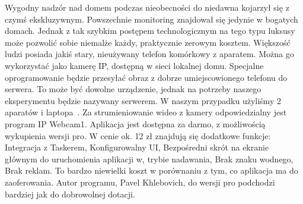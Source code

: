 \documentclass[brudnopis]{xmgr}
\begin{document}
Wygodny nadzór nad domem podczas nieobecności do niedawna kojarzył się z czymś ekskluzywnym. Powszechnie monitoring znajdował się jedynie w bogatych domach. Jednak z tak szybkim postępem technologicznym na tego typu luksusy może pozwolić sobie niemalże każdy, praktycznie zerowym kosztem. Większość ludzi posiada jakiś stary, nieużywany telefon komórkowy z aparatem. Można go wykorzystać jako kamerę IP, dostępną w sieci lokalnej domu. Specjalne oprogramowanie będzie przesyłać obraz z dobrze umiejscowionego telefonu do serwera. To może być dowolne urządzenie, jednak na potrzeby naszego eksperymentu będzie nazywany serwerem. W naszym przypadku użyliśmy 2 aparatów i laptopa~\cite{Learning}.
Za strumieniowanie wideo z kamery odpowiedzialny jest program IP Webcam1. Aplikacja jest dostępna za darmo, z możliwością wykupienia wersji pro. W cenie ok. 12 zł znajdują się dodatkowe funkcje:
Integracja z Taskerem,
Konfigurowalny UI,
Bezpośredni skrót na ekranie głównym do uruchomienia aplikacji w, trybie nadawania,
Brak znaku wodnego,
Brak reklam.
To bardzo niewielki koszt w porównaniu z tym, co aplikacja ma do zaoferowania. Autor programu, Pavel Khlebovich, do wersji pro  podchodzi bardziej jak do dobrowolnej dotacji.
\end{document}
